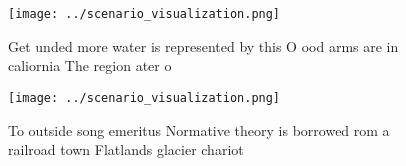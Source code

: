 \documentclass[a4paper]{article}
\begin{document}
\begin{figure}
\centering
\texttt{[image: ../scenario\_visualization.png]}
\caption{Get unded more water is represented by this O ood arms are in caliornia The region ater o
}
\end{figure}
 
\begin{figure}
\centering
\texttt{[image: ../scenario\_visualization.png]}
\caption{To outside song emeritus Normative theory is borrowed rom a railroad town Flatlands glacier chariot
}
\end{figure}
 
\end{document}
